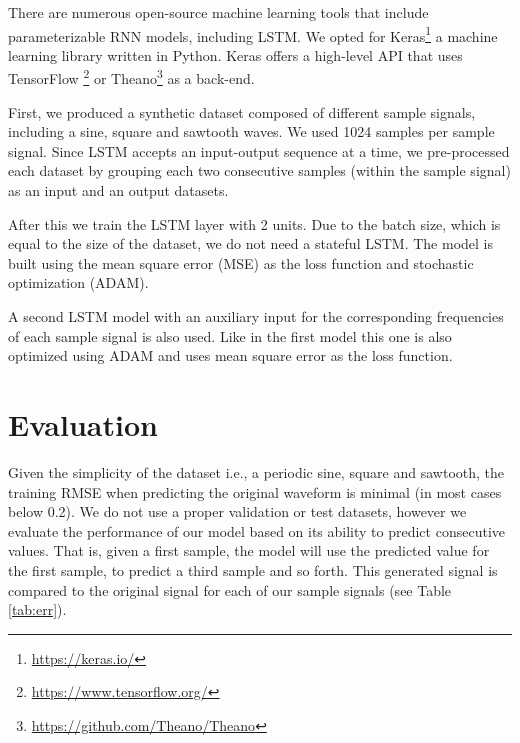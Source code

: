 \documentclass[conference]{IEEEtran}
\begin{document}
There are numerous open-source machine learning tools that include parameterizable RNN models, including LSTM. We opted for Keras\footnote{\url{https://keras.io/}} a machine learning library written in Python. Keras offers a high-level API that uses TensorFlow \footnote{\url{https://www.tensorflow.org/}} or Theano\footnote{\url{https://github.com/Theano/Theano}} as a back-end.

First, we produced a synthetic dataset composed of different sample signals, including a sine, square and sawtooth waves. We used 1024 samples per sample signal. Since LSTM accepts an input-output sequence at a time, we pre-processed each dataset by grouping each two consecutive samples (within the sample signal) as an input and an output datasets.

After this we train the LSTM layer with 2 units. Due to the batch size, which is equal to the size of the dataset, we do not need a stateful LSTM. The model is built using the mean square error (MSE) as the loss function and stochastic optimization (ADAM).

A second LSTM model with an auxiliary input for the corresponding frequencies of each sample signal is also used. Like in the first model this one is also optimized using ADAM and uses mean square error as the loss function.


\section{Evaluation}

Given the simplicity of the dataset i.e., a periodic sine, square and sawtooth, the training RMSE when predicting the original waveform is minimal (in most cases below 0.2). We do not use a proper validation or test datasets, however we evaluate the performance of our model based on its ability to predict consecutive values. That is, given a first sample, the model will use the predicted value for the first sample, to predict a third sample and so forth. This generated signal is compared to the original signal for each of our sample signals (see Table \ref{tab:err}).


\end{document}
